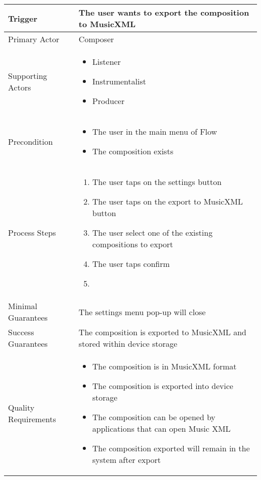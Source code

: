 \begin{longtable}{|X|X|}
\hline
Trigger & 
The user wants to export the composition to MusicXML\\
\hline
Primary Actor & 
Composer \\
\hline
Supporting Actors & 
\begin{itemize}
\item Listener
\item Instrumentalist
\item Producer
\end{itemize} \\
\hline
Precondition & 
\begin{itemize}
\item The user in the main menu of Flow
\item The composition exists
\end{itemize} \\
\hline
Process Steps & 
\begin{enumerate}
\item The user taps on the settings button
\item The user taps on the export to MusicXML button
\item The user select one of the existing compositions to export
\item The user taps confirm
\item 
\end{enumerate} \\
\hline
Minimal Guarantees & 
The settings menu pop-up will close \\
\hline
Success Guarantees & 
The composition is exported to MusicXML and stored within device storage\\
\hline
Quality Requirements & 
\begin{itemize}
\item The composition is in MusicXML format
\item The composition is exported into device storage
\item The composition can be opened by applications that can open Music XML
\item The composition exported will remain in the system after export
\end{itemize} \\ 
\hline
\end{longtable}